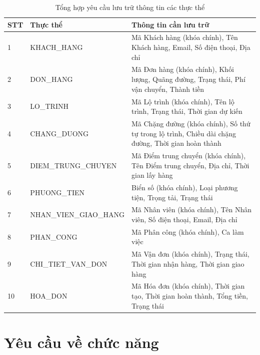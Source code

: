 \documentclass[11pt]{report}
\begin{document}
\begin{table}[H]
    \centering
    \renewcommand{\tabularxcolumn}[1]{m{#1}}
    \begin{tabularx}{\textwidth}{|l|l|X|} \hline
        \rowcolor{teal!30}
        \textbf{STT} & \textbf{Thực thể} & \textbf{Thông tin cần lưu trữ} \\ \hline
        1  & KHACH\_HANG            & Mã Khách hàng (khóa chính), Tên Khách hàng, Email, Số điện thoại, Địa chỉ \\ \hline
        2  & DON\_HANG              & Mã Đơn hàng (khóa chính), Khối lượng, Quãng đường, Trạng thái, Phí vận chuyển, Thành tiền \\ \hline
        3  & LO\_TRINH              & Mã Lộ trình (khóa chính), Tên lộ trình, Trạng thái, Thời gian dự kiến \\ \hline
        4  & CHANG\_DUONG           & Mã Chặng đường (khóa chính), Số thứ tự trong lộ trình, Chiều dài chặng đường, Thời gian hoàn thành \\ \hline
        5  & DIEM\_TRUNG\_CHUYEN    & Mã Điểm trung chuyển (khóa chính), Tên Điểm trung chuyển, Địa chỉ, Thời gian lấy hàng \\ \hline 
        6  & PHUONG\_TIEN           & Biển số (khóa chính), Loại phương tiện, Trọng tải, Trạng thái \\ \hline
        7  & NHAN\_VIEN\_GIAO\_HANG & Mã Nhân viên (khóa chính), Tên Nhân viên, Số điện thoại, Email, Địa chỉ \\ \hline
        8  & PHAN\_CONG             & Mã Phân công (khóa chính), Ca làm việc \\ \hline
        9  & CHI\_TIET\_VAN\_DON    & Mã Vận đơn (khóa chính), Trạng thái, Thời gian nhận hàng, Thời gian giao hàng \\ \hline
        10 & HOA\_DON               & Mã Hóa đơn (khóa chính), Thời gian tạo, Thời gian hoàn thành, Tổng tiền, Trạng thái \\ \hline
    \end{tabularx}
    \caption{Tổng hợp yêu cầu lưu trữ thông tin các thực thể}
    \label{tab:entities}
\end{table}


\section{Yêu cầu về chức năng}
\label{sec:yeucauchucnang}
\end{document}
